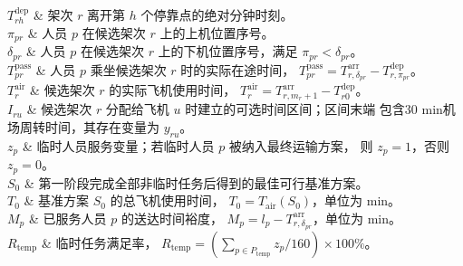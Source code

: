 $T_{rh}^{\mathrm{dep}}$
& 架次 $r$ 离开第 $h$ 个停靠点的绝对分钟时刻。 \\

$\pi_{pr}$
& 人员 $p$ 在候选架次 $r$ 上的上机位置序号。 \\

$\delta_{pr}$
& 人员 $p$ 在候选架次 $r$ 上的下机位置序号，满足
$\pi_{pr}<\delta_{pr}$。 \\

$T_{pr}^{\mathrm{pass}}$
& 人员 $p$ 乘坐候选架次 $r$ 时的实际在途时间，
$T_{pr}^{\mathrm{pass}}=
T_{r,\delta_{pr}}^{\mathrm{arr}}-T_{r,\pi_{pr}}^{\mathrm{dep}}$。 \\

$T_r^{\mathrm{air}}$
& 候选架次 $r$ 的实际飞机使用时间，
$T_r^{\mathrm{air}}=T_{r,m_r+1}^{\mathrm{arr}}-T_{r0}^{\mathrm{dep}}$。 \\

$I_{ru}$
& 候选架次 $r$ 分配给飞机 $u$ 时建立的可选时间区间；区间末端
包含30 min机场周转时间，其存在变量为 $y_{ru}$。 \\

$z_p$
& 临时人员服务变量；若临时人员 $p$ 被纳入最终运输方案，
则 $z_p=1$，否则 $z_p=0$。 \\

$S_0$
& 第一阶段完成全部非临时任务后得到的最佳可行基准方案。 \\

$T_0$
& 基准方案 $S_0$ 的总飞机使用时间，
$T_0=T_{\mathrm{air}}(S_0)$，单位为 min。 \\

$M_p$
& 已服务人员 $p$ 的送达时间裕度，
$M_p=l_p-T_{r,\delta_{pr}}^{\mathrm{arr}}$，单位为 min。 \\

$R_{\mathrm{temp}}$
& 临时任务满足率，
$R_{\mathrm{temp}}=
\left(\sum_{p\in P_{\mathrm{temp}}}z_p/160\right)\times100\%$。 \\
